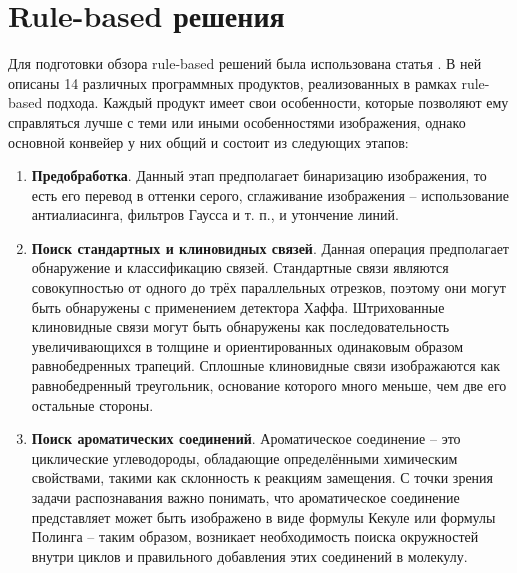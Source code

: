 \section{Rule-based решения} \label{ch1:sec2}
Для подготовки обзора rule-based решений была использована статья \cite{rajan2020review}. В ней описаны 14 различных программных продуктов, реализованных в рамках rule-based подхода. Каждый продукт имеет свои особенности, которые позволяют ему справляться лучше с теми или иными особенностями изображения, однако основной конвейер у них общий и состоит из следующих этапов:
\begin{enumerate}[1.]
	\item \textbf{Предобработка}. Данный этап предполагает бинаризацию изображения, то есть его перевод в оттенки серого, сглаживание изображения --  использование антиалиасинга, фильтров Гаусса и т. п., и утончение линий.
    \item \textbf{Поиск стандартных и клиновидных связей}. Данная операция предполагает обнаружение и классификацию связей. Стандартные связи являются совокупностью от одного до трёх параллельных отрезков, поэтому они могут быть обнаружены с применением детектора Хаффа. Штрихованные клиновидные связи могут быть обнаружены как последовательность увеличивающихся в толщине и ориентированных одинаковым образом равнобедренных трапеций. Сплошные клиновидные связи изображаются как равнобедренный треугольник, основание которого много меньше, чем две его остальные стороны.
    \item \textbf{Поиск ароматических соединений}. Ароматическое соединение -- это циклические углеводороды, обладающие определёнными химическим свойствами, такими как склонность к реакциям замещения. С точки зрения задачи распознавания важно понимать, что ароматическое соединение представляет может быть изображено в виде формулы Кекуле или формулы Полинга -- таким образом, возникает необходимость поиска окружностей внутри циклов и правильного добавления этих соединений в молекулу.
    

\end{enumerate}
